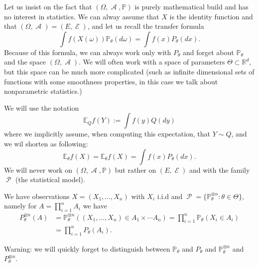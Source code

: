 \documentclass[
	fontsize=11pt, %
	twoside=false, %
	numbers=noenddot, %
]{kaobook}
\DeclareMathOperator{\cA}{\mathcal A}
\DeclareMathOperator{\cE}{\mathcal E}
\DeclareMathOperator{\cP}{\mathcal P}
\renewcommand{\P}{\mathbb P}
\newcommand{\E}{\mathbb E}
\newcommand{\R}{\mathbb R}
\begin{document}
Let us insist on the fact that $(\Omega, \cA, \P)$ is  purely mathematical build and has no interest in statistics.
We can alway assume that $X$ is the identity function and that $(\Omega, \cA) = (E, \cE)$, and let us recall the transfer formula
\begin{equation*}
	\int f(X(\omega)) \P_\theta(d \omega) = \int f(x) P_\theta(dx).
\end{equation*}
Because of this formula, we can always work only with $P_\theta$ and forget about $\P_\theta$ and the space $(\Omega, \cA)$.
We will often work with a space of parameters $\Theta \subset \R^d$, but this space can be much more complicated (such as infinite dimensional sets of functions with some smoothness properties, in this case we talk about nonparametric statistics.)

We will use the notation
\begin{equation*}
	\E_Q f(Y) := \int f(y) Q(dy)
\end{equation*}
where we implicitly assume, when computing this expectation, that $Y \sim Q$, and we wil shorten as following:
\begin{equation*}
	\E_\theta f(X) = \E_\theta f(X) = \int f(x) P_\theta(dx).
\end{equation*}
We will never work on $(\Omega, \cA, \P)$ but rather on $(E, \cE)$ and with the family $\cP$ (the statistical model).
\begin{definition}
We have observations $X = (X_1, \ldots, X_n)$ with $X_i$ i.i.d and $\cP = \{ \P_\theta^{\otimes n} : \theta \in \Theta\}$, namely for $A = \prod_{i=1}^n A_i$ we have
\begin{align*}
	P_\theta^{\otimes n}(A) &= \P_\theta^{\otimes n}( (X_1, \ldots, X_n) \in A_1 \times \cdots A_n) = \prod_{i=1}^n \P_\theta(X_i \in A_i) \\
	&= \prod_{i=1}^n P_\theta(A_i).
\end{align*}
\end{definition}

Warning: we will quickly forget to distinguish between $\P_\theta$ and $P_\theta$ and $\P_\theta^{\otimes n}$ and $P_\theta^{\otimes n}$. 
\end{document}
